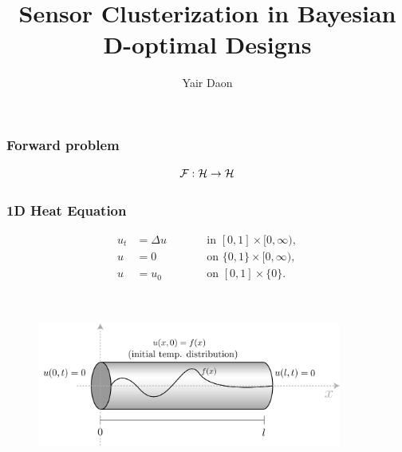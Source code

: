 \documentclass{beamer}
\title{Sensor Clusterization in Bayesian D-optimal Designs}
\author{Yair Daon}
\institute{Azrieli Faculty of Medicine, Bar-Ilan University}
\date{}
\begin{document}

\begin{frame}
  \titlepage
\end{frame}

\begin{frame}
\frametitle{Forward problem}

\[
\mathcal{F}: \mathcal{H} \to \mathcal{H}
\]

\begin{figure}
  \centering
\end{figure}
\end{frame}



\begin{frame}
\frametitle{1D Heat Equation}
\begin{subequations}
  \begin{align*}
    u_t &= \Delta u &&\qquad \text{in } [0,1] \times [0,\infty),\\
      u &= 0 &&\qquad \text{on } \{0, 1\} \times [0,\infty),\\
        u &= u_0 &&\qquad \text{on }[0,1] \times \{0\}.
  \end{align*}
\end{subequations}

\begin{figure}
  \centering
  \includegraphics[width=10cm,height=6cm]{heat_rod.png} 
\end{figure}
\end{frame}
\end{document}
